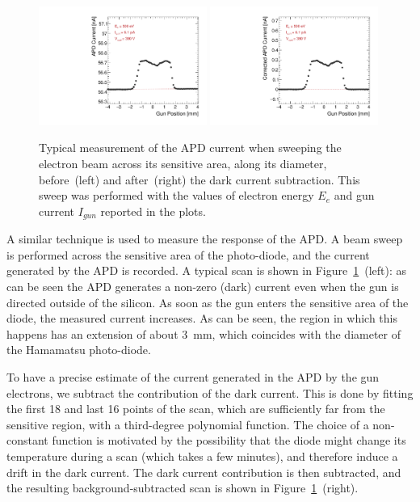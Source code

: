 \documentclass[12p]{paper}
\begin{document}
\begin{figure}[tb]
  \centering
\includegraphics[width=0.49\textwidth]{figures/scanAPD.pdf}
\includegraphics[width=0.49\textwidth]{figures/scanAPD_corr.pdf}
 \caption{Typical measurement of the APD current when sweeping the electron beam across its sensitive area, along its diameter, before~(left) and after~(right) the dark current subtraction. This sweep was performed with the values of electron energy $E_e$ and gun current $I_{gun}$ reported in the plots.
  \label{fig:apd_scan}}
\end{figure}

A similar technique is used to measure the response of the APD. A beam sweep is performed across the sensitive area of the photo-diode, and the current generated by the APD is recorded. A typical scan is shown in Figure~\ref{fig:apd_scan}~(left): as can be seen the APD generates a non-zero (dark) current even when the gun is directed outside of the silicon. As soon as the gun enters the sensitive area of the diode, the measured current increases. As can be seen, the region in which this happens has an extension of about 3~mm, which coincides with the diameter of the Hamamatsu photo-diode.

To have a precise estimate of the current generated in the APD by the gun electrons, we subtract the contribution of the dark current. This is done by fitting the first 18 and last 16 points of the scan, which are sufficiently far from the sensitive region, with a third-degree polynomial function. The choice of a non-constant function is motivated by the possibility that the diode might change its temperature during a scan (which takes a few minutes), and therefore induce a drift in the dark current. The dark current contribution is then subtracted, and the resulting background-subtracted scan is shown in Figure~\ref{fig:apd_scan}~(right).
\end{document}
